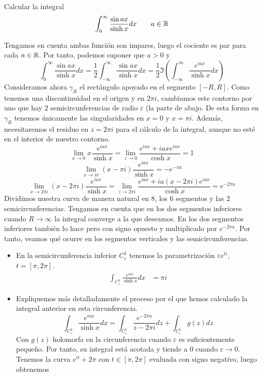 \documentclass[twoside]{article}
\begin{document}
\begin{ejercicio}{4}
Calcular la integral
$$
\int_0^\infty \frac{\sin ax}{\sinh x}dx \qquad a \in \mathbb{R}
$$
\end{ejercicio}
\begin{solucion}
Tengamos en cuenta ambas función son impares, luego el cociente es par para cada $a\in \mathbb{R}$. Por tanto, podemos suponer que $a>0$ y
$$
\int_0^\infty \frac{\sin ax}{\sinh x}dx 
 = \frac{1}{2} \int_{-\infty}^\infty \frac{\sin ax}{\sinh x}dx = \frac{1}{2}\Im\left( \int_{-\infty}^\infty \frac{e^{iax}}{\sinh x}dx\right)
$$
Consideramos ahora $\gamma_R$ el rectángulo apoyado en el segmento $[-R,R]$. Como tenemos una discontinuidad en el origen y en $2\pi i$, cambiamos este contorno por uno que hay $2$ semicircunferencias de radio $\varepsilon$ (la parte de abajo. De esta forma en $\gamma_R$ tenemos únicamente las singularidades en $x=0$ y $x=\pi i$. Además, necesitaremos el residuo en $z=2\pi i$ para el cálculo de la integral, aunque no esté en el interior de nuestro contorno.
$$
\lim_{x\to0}x\frac{e^{iax}}{\sinh x} = \lim_{z\to0}\frac{e^{iax}+iaxe^{iax}}{\cosh x} = 1
$$
$$
\lim_{x\to \pi i}(x-\pi i)\frac{e^{iax}}{\sinh x} = -e^{ -\pi a}
$$
$$
\lim_{x\to 2\pi i}(x-2\pi i)\frac{e^{iax}}{\sinh x} = \lim_{z\to 2\pi i}\frac{e^{iax}+ia(x-2\pi i)e^{iax}}{\cosh x} = e^{-2\pi a}
$$
Dividimos nuestra curva de manera natural en $8$, los $6$ segmentos y las $2$ semicircunferencias. Tengamos en cuenta que en los dos segmentos inferiores cuando $R\to \infty$ la integral converge a la que deseamos. En los dos segmentos inferiores también lo hace pero con signo opuesto y multiplicado por $e^{-2\pi a}$. Por tanto, veamos qué ocurre en los segmentos verticales y las semicircunferencias.
\begin{itemize}
\item En la semicircunferencia inferior $C^1_\varepsilon$ tenemos la parametrización $\varepsilon e^{ti}$, $t=[\pi,2\pi]$.
\begin{align*}
\int_{C^1_\varepsilon} \frac{e^{iax}}{\sinh x}dx &=   \pi i
\end{align*}
\item Expliquemos más detalladamente el proceso por el que hemos calculado la integral anterior en esta circunferencia.
$$
\int_{C^2_\varepsilon} \frac{e^{iax}}{\sinh x}dx =  \int_{C^1_\varepsilon} \frac{e^{-2\pi a}}{z-2\pi i} dz + \int_{C^1_\varepsilon} g(z)dz
$$
Con $g(z)$ holomorfa en la circunferencia cuando $\varepsilon$ es suficientemente pequeño. Por tanto, su integral está acotada y tiende a $0$ cuando $\varepsilon \to 0$. Tenemos la curva $e^{it}+2\pi$ con $t\in [\pi,2\pi]$ evaluada con signo negativo, luego obtenemos

\end{itemize}
\end{solucion}
\end{document}

